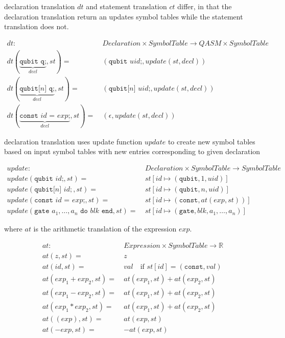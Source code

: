 declaration translation $dt$ and statement translation $ct$ differ, in that the declaration translation return an updates symbol tables while the statement translation does not. 

\begin{align*}
    dt : \ & Declaration \times SymbolTable \to QASM \times SymbolTable\\
    dt(\underbrace{\texttt{qubit q;}}_{decl}, st) = \ & (\texttt{qubit } uid\texttt{;}, update(st, decl))\\
    dt(\underbrace{\texttt{qubit[} n \texttt{] q;}}_{decl}, st) = \ & (\texttt{qubit[}n \texttt{] } uid\texttt{;}, update(st, decl))\\
    dt(\underbrace{\texttt{const } id \texttt{ = } exp \texttt{;}}_{decl}, st) = \ & (\epsilon, update(st, decl))
\end{align*}

declaration translation uses update function $update$ to create new symbol tables based on input symbol tables with new entries corresponding to given declaration

\begin{align*}
    update : \ & Declaration \times SymbolTable \to SymbolTable\\
    update(\texttt{qubit } id\texttt{;}, st) = \ & st[id \mapsto (\texttt{qubit}, 1, uid)]\\
    update(\texttt{qubit[}n \texttt{] } id{;}, st) = \ & st[id \mapsto (\texttt{qubit}, n, uid)]\\
    update(\texttt{const } id \texttt{ = } exp \texttt{;}, st) = \ & st[id \mapsto (\texttt{const}, at(exp, st))]\\
    update(\texttt{gate } a_1, \dots, a_n \texttt{ do } blk \texttt{ end}, st) = \ & st[id \mapsto (\texttt{gate}, blk, a_1, \dots, a_n)]
\end{align*}

where $at$ is the arithmetic translation of the expression $exp$.


\begin{align*}
    at : \ & Expression \times SymbolTable \to \mathbb{R}\\
    at(z, st) = \ & z\\
    at(id, st) = \ & val \quad \text{if } st[id] = (\texttt{const}, val)\\
    at(exp_1 + exp_2, st) = \ & at(exp_1, st) + at(exp_2, st)\\
    at(exp_1 - exp_2, st) = \ & at(exp_1, st) + at(exp_2, st)\\
    at(exp_1 * exp_2, st) = \ & at(exp_1, st) + at(exp_2, st)\\
    at((exp), st) = \ & at(exp, st)\\
    at(-exp, st) = \ & -at(exp, st)
\end{align*}


